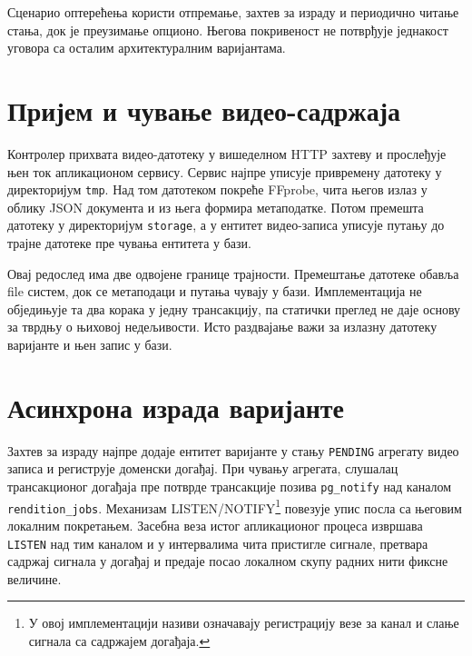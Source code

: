 \documentclass[12pt,oneside]{memoir}
\begin{document}

Сценарио оптерећења користи отпремање, захтев за израду и периодично читање
стања, док је преузимање опционо. Његова покривеност не потврђује једнакост
уговора са осталим архитектуралним варијантама.


\section{Пријем и чување видео-садржаја}

Контролер прихвата видео-датотеку у вишеделном {\lat HTTP} захтеву и прослеђује
њен ток апликационом сервису. Сервис најпре уписује привремену датотеку у
директоријум \texttt{tmp}. Над том датотеком покреће {\lat FFprobe}, чита његов
излаз у облику {\lat JSON} документа и из њега формира метаподатке. Потом
премешта датотеку у директоријум \texttt{storage}, а у ентитет видео-записа
уписује путању до трајне датотеке пре чувања ентитета у бази.


Овај редослед има две одвојене границе трајности. Премештање датотеке обавља
{\lat file} систем, док се метаподаци и путања чувају у бази. Имплементација не
обједињује та два корака у једну трансакцију, па статички преглед не даје основу
за тврдњу о њиховој недељивости. Исто раздвајање важи за излазну датотеку
варијанте и њен запис у бази.

\section{Асинхрона израда варијанте}

Захтев за израду најпре додаје ентитет варијанте у стању
\texttt{PENDING} агрегату видео записа и региструје доменски догађај. При
чувању агрегата, слушалац трансакционог догађаја пре потврде трансакције позива
\texttt{pg\_notify} над каналом \texttt{rendition\_jobs}. Механизам
{\lat LISTEN/NOTIFY}\footnote{У овој имплементацији називи означавају
	регистрацију везе за канал и слање сигнала са садржајем догађаја.} повезује
упис посла са његовим локалним покретањем. Засебна веза истог
апликационог процеса извршава \texttt{LISTEN} над тим каналом и у интервалима
чита пристигле сигнале, претвара садржај сигнала у догађај и предаје посао
локалном скупу радних нити фиксне величине.
\end{document}
